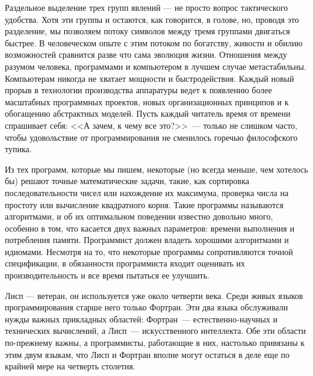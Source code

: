 Раздельное выделение трех групп явлений --- не просто вопрос
тактического удобства.  Хотя эти группы и остаются, как говорится, в голове,
но, проводя это разделение, мы позволяем потоку символов между тремя группами
двигаться быстрее.  В человеческом опыте с этим потоком по богатству, живости и
обилию возможностей сравнится разве что сама эволюция жизни. Отношения
между разумом человека, программами и компьютером в лучшем случае
метастабильны.  Компьютерам никогда не хватает мощности и быстродействия.  Каждый новый прорыв в
технологии производства аппаратуры ведет к появлению более масштабных
программных проектов, новых организационных принципов и к обогащению
абстрактных моделей.  Пусть каждый читатель время от времени
спрашивает себя: <<А зачем, к чему все это?>>~--- только не слишком
часто, чтобы удовольствие от программирования не сменилось горечью
философского тупика.

\pagebreak

Из тех программ, которые мы пишем, некоторые (но всегда
меньше, чем хотелось бы) решают точные математические задачи, такие, как
сортировка последовательности чисел или нахождение их максимума,
проверка числа на простоту или вычисление квадратного корня.  Такие
программы называются алгоритмами, и об их оптимальном
поведении известно довольно много, особенно в том, что касается двух
важных параметров: времени выполнения и потребления памяти.  
Программист должен владеть хорошими алгоритмами и идиомами.  
Несмотря на то, что некоторые программы	сопротивляются точной спецификации, 
в обязанности программиста входит оценивать их производительность и все 
время пытаться ее улучшить.

Лисп --- ветеран, он используется уже около четверти века.
Среди живых языков программирования старше него только Фортран.  Эти два языка
обслуживали нужды важных прикладных областей: Фортран~--- естественно-научных и
технических вычислений, а Лисп~--- искусственного интеллекта. Обе эти
области по-прежнему важны, а программисты, работающие в них, настолько привязаны к
этим двум языкам, что Лисп и Фортран вполне могут остаться в деле еще по
крайней мере на четверть столетия.

